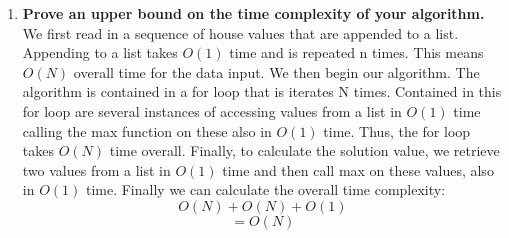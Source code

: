 \documentclass[11pt, oneside]{article}   	%
\begin{document}
\begin{enumerate}
\begin{enumerate}
\begin{enumerate}
		\end{enumerate}

		\newpage		
		\item \textbf{Prove an upper bound on the time complexity of your algorithm.}\\
		We first read in a sequence of house values that are appended to a list. Appending to a list takes $O(1)$ time and is repeated n times. This means $O(N)$ overall time for the data input. We then begin our algorithm. The algorithm is contained in a for loop that is iterates N times. Contained in this for loop are several instances of accessing values from a list in $O(1)$ time calling the max function on these also in $O(1)$ time. Thus, the for loop takes $O(N)$ time overall. Finally, to calculate the solution value, we retrieve two values from a list in $O(1)$ time and then call max on these values, also in $O(1)$ time. Finally we can calculate the overall time complexity:
		\[ O(N) + O(N) + O(1)\]
		\[ = O(N) \]

		
		\end{enumerate}

\end{enumerate}
\end{document}
